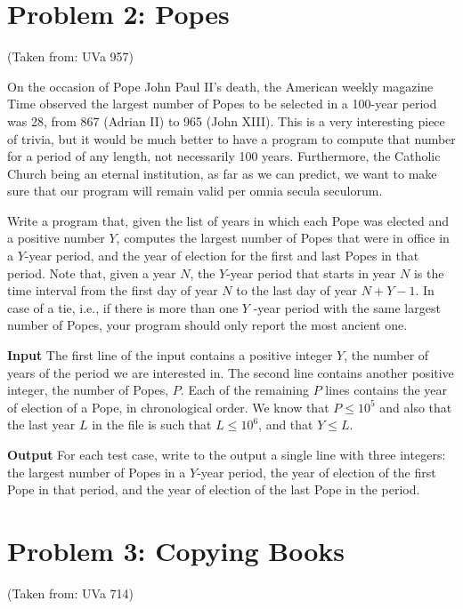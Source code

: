 \normalfont\documentclass[letterpaper,11pt]{article}
\begin{document}
\section*{Problem 2: Popes}
(Taken from: UVa 957)

On the occasion of Pope John Paul II's death, the American weekly magazine Time observed the largest number of Popes to be selected in a 100-year period was 28, from 867 (Adrian II) to 965 (John XIII). This is a very interesting piece of trivia, but it would be much better to have a program to compute that number for a period of any length, not necessarily 100 years. Furthermore, the Catholic Church being an eternal institution, as far as we can predict, we want to make sure that our program will remain valid per omnia secula seculorum.

Write a program that, given the list of years in which each Pope was elected and a positive number $Y$, computes the largest number of Popes that were in office in a $Y$-year period, and the year of election for the first and last Popes in that period. Note that, given a year $N$, the $Y$-year period that starts in year $N$ is the time interval from the first day of year $N$ to the last day of year $N + Y - 1$. In case of a tie, i.e., if there is more than one $Y$ -year period with the same largest number of Popes, your program should only report the most ancient one.

\textbf{Input} \newline
The first line of the input contains a positive integer $Y$, the number of years of the period we are interested in. The second line contains another positive integer, the number of Popes, $P$. Each of the remaining $P$ lines contains the year of election of a Pope, in chronological order. We know that $P \leq 10^5$ and also that the last year $L$ in the file is such that $L \leq 10^6$, and that $Y \leq L$.

\textbf{Output} \newline
For each test case, write to the output a single line with three integers: the largest number of Popes in a $Y$-year period, the year of election of the first Pope in that period, and the year of election of the last Pope in the period.

\newpage

\section*{Problem 3: Copying Books}
(Taken from: UVa 714)
\end{document}
